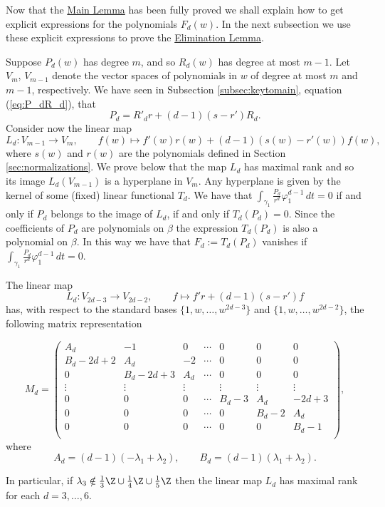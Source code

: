 Now that the \hyperref[lemma:main]{Main Lemma} has been fully proved we shall explain how to get explicit expressions for the polynomials $F_d(w)$. In the next subsection we use these explicit expressions to prove the \hyperref[lemma:elimination]{Elimination Lemma}.

Suppose $P_d(w)$ has degree $m$, and so $R_d(w)$ has degree at most $m-1$. Let $V_m$, $V_{m-1}$ denote the vector spaces of polynomials in $w$ of degree at most $m$ and $m-1$, respectively. We have seen in Subsection \ref{subsec:keytomain}, equation (\ref{eq:P_dR_d}), that 
\[ P_d=R'_dr+(d-1)(s-r')R_d. \]
Consider now the linear map
\[ L_d\colon V_{m-1}\longrightarrow V_m, \qquad f(w)\longmapsto f'(w)r(w)+(d-1)(s(w)-r'(w))f(w), \]
where $s(w)$ and $r(w)$ are the polynomials defined in Section \ref{sec:normalizations}. We prove below that the map $L_d$ has maximal rank and so its image $L_d(V_{m-1})$ is a hyperplane in $V_m$. Any hyperplane is given by the kernel of some (fixed) linear functional $T_d$. We have that $\int_{\gamma_1}\frac{P_d}{r^d}\varphi_1^{d-1}\,dt=0$ if and only if $P_d$ belongs to the image of $L_d$, if and only if $T_d(P_d)=0$. Since the coefficients of $P_d$ are polynomials on $\beta$ the expression $T_d(P_d)$ is also a polynomial on $\beta$. In this way we have that $F_d:=T_d(P_d)$ vanishes if $\int_{\gamma_1}\frac{P_d}{r^d}\varphi_1^{d-1}\,dt=0$.

\begin{proposition}\label{prop:rankLd}
The linear map
\[ L_d\colon V_{2d-3}\longrightarrow V_{2d-2}, \qquad f\longmapsto f'r+(d-1)(s-r')f\]
has, with respect to the standard bases $\{1,w,\ldots,w^{2d-3}\}$ and $\{1,w,\ldots,w^{2d-2}\}$, the following matrix representation

\[ M_d=\begin{pmatrix}
A_d & -1 & 0 & \cdots & 0 & 0 & 0\\
B_d-2d+2 & A_d & -2 & \cdots & 0 & 0 & 0\\
0 & B_d-2d+3 & A_d & \cdots & 0 & 0 & 0\\
\vdots & \vdots & \vdots & ~ & \vdots & \vdots & \vdots\\
0 & 0 & 0 & \cdots & B_d-3 & A_d & -2d+3\\
0 & 0 & 0 & \cdots & 0 & B_d-2 & A_d\\
0 & 0 & 0 & \cdots & 0 & 0 & B_d-1\\
   \end{pmatrix},\]
where
\[ A_d=(d-1)(-\lambda_1+\lambda_2), \qquad B_d=(d-1)(\lambda_1+\lambda_2). \]

In particular, if $\lambda_3\notin\frac{1}{3}\Z\cup\frac{1}{4}\Z\cup\frac{1}{5}\Z$ then the linear map $L_d$ has maximal rank for each $d=3,\ldots,6$.
\end{proposition}

